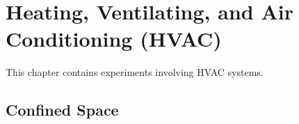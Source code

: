 \chapter{Heating, Ventilating, and Air Conditioning (HVAC)}

This chapter contains experiments involving HVAC systems.

\section{Confined Space}






